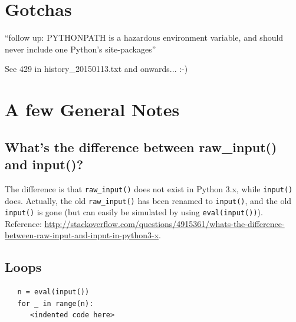\documentclass[11pt,a4paper]{article}
\begin{document}
\newpage
\section{Gotchas}
``follow up: PYTHONPATH is a hazardous environment variable, and should never include one Python's site-packages'' 

See 429 in history\_20150113.txt and onwards... :-) 




\newpage
\section{A few General Notes}
    \subsection{What's the difference between raw\_input() and input()?}
    The difference is that {\tt raw\_input()} does not exist in Python 3.x,
    while {\tt input()} does. Actually, the old {\tt raw\_input()} has been renamed to
     {\tt input()}, and the old  {\tt input()} is gone (but can easily be simulated by
    using  {\tt eval(input())}).
    Reference: \href{http://stackoverflow.com/questions/4915361/whats-the-difference-between-raw-input-and-input-in-python3-x}{http://stackoverflow.com/questions/4915361/whats-the-difference-between-raw-input-and-input-in-python3-x}. 
   

    \subsection{Loops}
    \begin{lstlisting}
   n = eval(input())
   for _ in range(n):
      <indented code here>
  \end{lstlisting}
\end{document}
